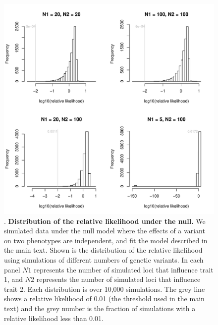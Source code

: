 \documentclass[11pt,titlepage]{article}
\begin{document}
\begin{figure}
\begin{center}
\includegraphics[scale = 0.5]{figs/dist_ratio.pdf}
\caption{. \textbf{Distribution of the relative likelihood under the null.} We simulated data under the null model where the effects of a variant on two phenotypes are independent, and fit the model described in the main text. Shown is the distribution of the relative likelihood using simulations of different numbers of genetic variants. In each panel $N1$ represents the number of simulated loci that influence trait 1, and $N2$ represents the number of simulated loci that influence trait 2. Each distribution is over 10,000 simulations. The grey line shows a relative likelihood of 0.01 (the threshold used in the main text) and the grey number is the fraction of simulations with a relative likelihood less than 0.01.}\label{f_causal_null}
\end{center}
\end{figure}
\end{document}
